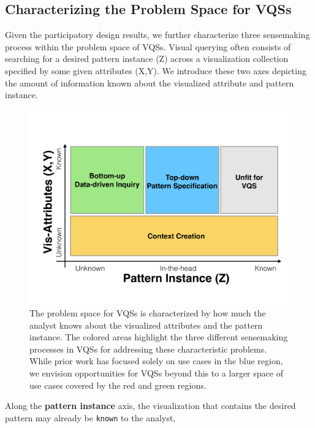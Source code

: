 \subsection{Characterizing the Problem Space for VQSs}
Given the participatory design results, 
we further characterize three sensemaking process 
within the problem space of VQSs. 
Visual querying often consists of searching for 
a desired pattern instance (Z) 
across a visualization collection specified by some 
given attributes (X,Y). 
We introduce these two axes depicting the 
amount of information known 
about the visualized attribute and pattern instance.%
\begin{figure}[h!]
  \centering
  \includegraphics[width=0.9\linewidth]{figures/2dmodel.pdf}
  \caption{The problem space for VQSs is characterized by how much the analyst knows about the visualized attributes and the pattern instance. The colored areas highlight the three different sensemaking processes in VQSs for addressing these characteristic problems. While prior work has focused solely on use cases in the blue region, we envision opportunities for VQSs beyond this to a larger space of use cases covered by the red and green regions.}
  \label{2dmodel}
  \vspace{-10pt}
\end{figure}
\par Along the \textbf{pattern instance} axis, 
the visualization that contains 
the desired pattern may already be \texttt{known} to the analyst, 
